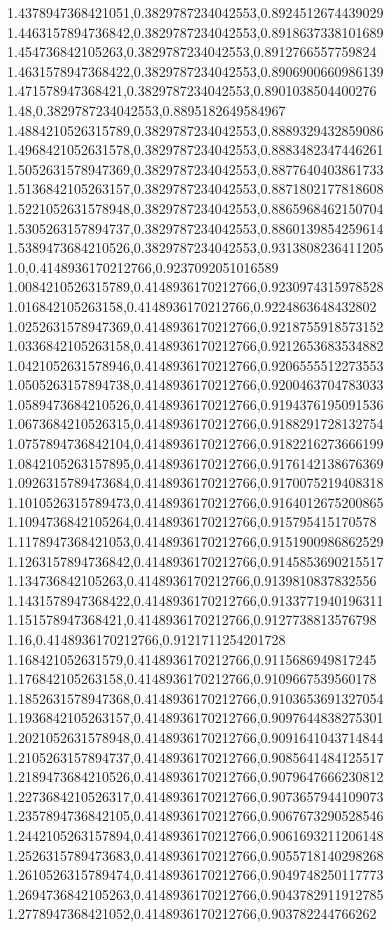 1.4378947368421051,0.3829787234042553,0.8924512674439029
1.4463157894736842,0.3829787234042553,0.8918637338101689
1.454736842105263,0.3829787234042553,0.8912766557759824
1.4631578947368422,0.3829787234042553,0.8906900660986139
1.471578947368421,0.3829787234042553,0.8901038504400276
1.48,0.3829787234042553,0.8895182649584967
1.4884210526315789,0.3829787234042553,0.8889329432859086
1.4968421052631578,0.3829787234042553,0.8883482347446261
1.5052631578947369,0.3829787234042553,0.8877640403861733
1.5136842105263157,0.3829787234042553,0.8871802177818608
1.5221052631578948,0.3829787234042553,0.8865968462150704
1.5305263157894737,0.3829787234042553,0.8860139854259614
1.5389473684210526,0.3829787234042553,0.9313808236411205
1.0,0.4148936170212766,0.9237092051016589
1.0084210526315789,0.4148936170212766,0.9230974315978528
1.016842105263158,0.4148936170212766,0.9224863648432802
1.0252631578947369,0.4148936170212766,0.9218755918573152
1.0336842105263158,0.4148936170212766,0.9212653683534882
1.0421052631578946,0.4148936170212766,0.9206555512273553
1.0505263157894738,0.4148936170212766,0.9200463704783033
1.0589473684210526,0.4148936170212766,0.9194376195091536
1.0673684210526315,0.4148936170212766,0.9188291728132754
1.0757894736842104,0.4148936170212766,0.9182216273666199
1.0842105263157895,0.4148936170212766,0.9176142138676369
1.0926315789473684,0.4148936170212766,0.9170075219408318
1.1010526315789473,0.4148936170212766,0.9164012675200865
1.1094736842105264,0.4148936170212766,0.915795415170578
1.1178947368421053,0.4148936170212766,0.9151900986862529
1.1263157894736842,0.4148936170212766,0.9145853690215517
1.134736842105263,0.4148936170212766,0.9139810837832556
1.1431578947368422,0.4148936170212766,0.9133771940196311
1.151578947368421,0.4148936170212766,0.9127738813576798
1.16,0.4148936170212766,0.9121711254201728
1.168421052631579,0.4148936170212766,0.9115686949817245
1.176842105263158,0.4148936170212766,0.9109667539560178
1.1852631578947368,0.4148936170212766,0.9103653691327054
1.1936842105263157,0.4148936170212766,0.9097644838275301
1.2021052631578948,0.4148936170212766,0.9091641043714844
1.2105263157894737,0.4148936170212766,0.9085641484125517
1.2189473684210526,0.4148936170212766,0.9079647666230812
1.2273684210526317,0.4148936170212766,0.9073657944109073
1.2357894736842105,0.4148936170212766,0.9067673290528546
1.2442105263157894,0.4148936170212766,0.9061693211206148
1.2526315789473683,0.4148936170212766,0.9055718140298268
1.2610526315789474,0.4148936170212766,0.9049748250117773
1.2694736842105263,0.4148936170212766,0.9043782911912785
1.2778947368421052,0.4148936170212766,0.903782244766262
